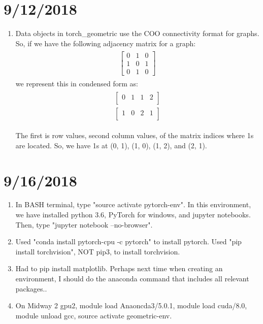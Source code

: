 \documentclass[12pt,reqno]{amsart}
\numberwithin{equation}{section}
\begin{document}
\section{9/12/2018}
\begin{enumerate}
\item Data objects in torch\_geometric use the COO connectivity format for graphs.  So, if we have the following adjacency matrix for a graph:
\begin{align}
\begin{split}
\begin{bmatrix}
0 & 1 & 0 \\
1 & 0 & 1  \\
0 & 1 & 0  
\end{bmatrix}
\end{split}
\end{align}
we represent this in condensed form as:
\begin{align}
\begin{split}
\begin{bmatrix}
0 & 1 & 1 & 2 \\
\end{bmatrix}\\
\begin{bmatrix}
1 & 0 & 2 & 1 \\
\end{bmatrix}
\end{split}
\end{align}

The first is row values, second column values, of the matrix indices where 1s are located.  So, we have 1s at (0, 1), (1, 0), (1, 2), and (2, 1).  

\end{enumerate}

\section{9/16/2018}
\begin{enumerate}
\item In BASH terminal, type "source activate pytorch-env".  In this environment, we have installed python 3.6, PyTorch for windows, and jupyter notebooks.  Then, type "jupyter notebook --no-browser".  
\item Used "conda install pytorch-cpu -c pytorch" to install pytorch.  Used "pip install torchvision", NOT pip3, to install torchvision.  
\item Had to pip install matplotlib.  Perhaps next time when creating an environment, I should do the anaconda command that includes all relevant packages..
\item On Midway 2 gpu2, module load Anaoncda3/5.0.1, module load cuda/8.0, module unload gcc, source activate geometric-env.  
\end{enumerate}




\normalsize

\end{document}
